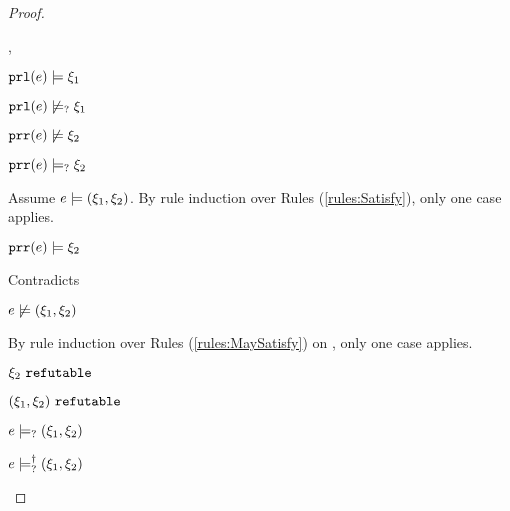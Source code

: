 \begin{proof}
\begin{byCases}
\begin{byCases}
\begin{byCases}
        \item[\csatisfy{\hprl{e}}{\xi_1},\cmaysatisfy{\hprr{e}}{\xi_2}]
            \begin{pfsteps*}
            \item $\mathtt{prl}(e) \models \xi_1$  
            \item $\mathtt{prl}(e) \not\models_{?} \xi_1$  
            \item $\mathtt{prr}(e) \not\models \xi_2$  
            \item $\mathtt{prr}(e) \models_{?} \xi_2$  
            \end{pfsteps*}
            Assume $e \models (\xi_1 , \xi_2)$. By rule induction over Rules (\ref{rules:Satisfy}), only one case applies.
            \begin{byCases}
            \item[\text{(\ref{rule:CSNotValPair})}]
                \begin{pfsteps*}
                \item $\mathtt{prr}(e) \models \xi_2$ 
                \end{pfsteps*}
                Contradicts 
            \end{byCases}
            \begin{pfsteps*}
            \item $e \not\models (\xi_1 , \xi_2)$  
            \end{pfsteps*}
            By rule induction over Rules (\ref{rules:MaySatisfy}) on , only one case applies. 
            \begin{byCases}
            \item[\text{(\ref{rule:CMSNotVal})}]
                \begin{pfsteps*}
                \item $\xi_2 ~\mathtt{refutable}$  
                \item $(\xi_1 , \xi_2) ~\mathtt{refutable}$  
                \item $e \models_{?} (\xi_1 , \xi_2)$  
                \item $e \models_{?}^{\dag} (\xi_1 , \xi_2)$ 
                \end{pfsteps*}
            \end{byCases}
            

\end{byCases}
\end{byCases}
\end{byCases}
\end{proof}
